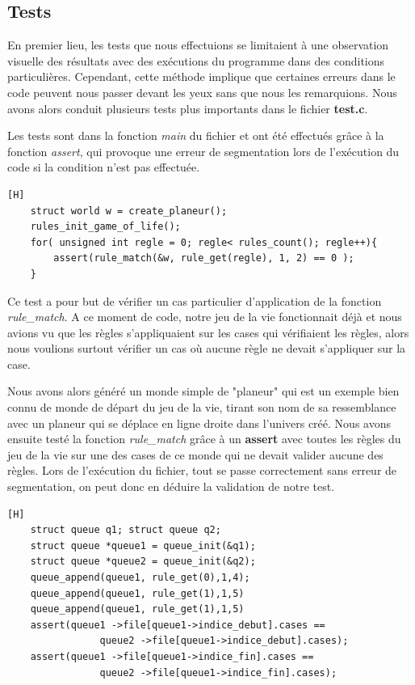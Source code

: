 \documentclass[11pt, a4paper]{article}
\begin{document}
\subsection{Tests}

En premier lieu, les tests que nous effectuions se limitaient à une observation visuelle des résultats avec des exécutions du programme dans des conditions particulières. Cependant, cette méthode implique que certaines erreurs dans le code peuvent nous passer devant les yeux sans que nous les remarquions. Nous avons alors conduit plusieurs tests plus importants dans le fichier \textbf{test.c}.

Les tests sont dans la fonction \textit{main} du fichier et ont été effectués grâce à la fonction \textit{assert}, qui provoque une erreur de segmentation lors de l'exécution du code si la condition n'est pas effectuée.

\begin{lstlisting}[frame = single][H]
    struct world w = create_planeur();
    rules_init_game_of_life();
    for( unsigned int regle = 0; regle< rules_count(); regle++){
        assert(rule_match(&w, rule_get(regle), 1, 2) == 0 );
    }
\end{lstlisting}

Ce test a pour but de vérifier un cas particulier d'application de la fonction \textit{rule\_match}. A ce moment de code, notre jeu de la vie fonctionnait déjà et nous avions vu que les règles s'appliquaient sur les cases qui vérifiaient les règles, alors nous voulions surtout vérifier un cas où aucune règle ne devait s'appliquer sur la case.

Nous avons alors généré un monde simple de "planeur" qui est un exemple bien connu de monde de départ du jeu de la vie, tirant son nom de sa ressemblance avec un planeur qui se déplace en ligne droite dans l'univers créé. Nous avons ensuite testé la fonction \textit{rule\_match} grâce à un \textbf{assert} avec toutes les règles du jeu de la vie sur une des cases de ce monde qui ne devait valider aucune des règles. Lors de l'exécution du fichier, tout se passe correctement sans erreur de segmentation, on peut donc en déduire la validation de notre test.

\begin{lstlisting}[frame = single][H]
    struct queue q1; struct queue q2;
    struct queue *queue1 = queue_init(&q1);
    struct queue *queue2 = queue_init(&q2);
    queue_append(queue1, rule_get(0),1,4);
    queue_append(queue1, rule_get(1),1,5)
    queue_append(queue1, rule_get(1),1,5)
    assert(queue1 ->file[queue1->indice_debut].cases == 
                queue2 ->file[queue1->indice_debut].cases);
    assert(queue1 ->file[queue1->indice_fin].cases ==
                queue2 ->file[queue1->indice_fin].cases);
\end{lstlisting}
\end{document}
